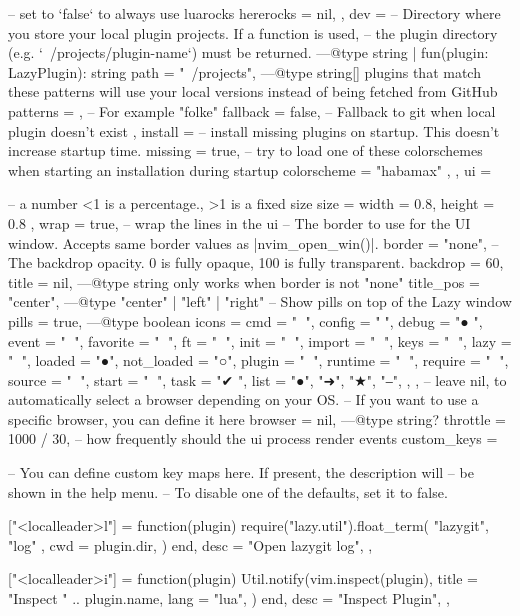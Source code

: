 \begin{listing}
{{-- set to `false` to always use luarocks
hererocks = nil,
},
dev = {
-- Directory where you store your local plugin projects. If a function is used,
-- the plugin directory (e.g. `~/projects/plugin-name`) must be returned.
---@type string | fun(plugin: LazyPlugin): string
path = "~/projects",
---@type string[] plugins that match these patterns will use your local versions instead of being fetched from GitHub
patterns = {}, -- For example {"folke"}
fallback = false, -- Fallback to git when local plugin doesn't exist
},
install = {
-- install missing plugins on startup. This doesn't increase startup time.
missing = true,
-- try to load one of these colorschemes when starting an installation during startup
colorscheme = { "habamax" },
},
ui = {
-- a number <1 is a percentage., >1 is a fixed size
size = { width = 0.8, height = 0.8 },
wrap = true, -- wrap the lines in the ui
-- The border to use for the UI window. Accepts same border values as |nvim_open_win()|.
border = "none",
-- The backdrop opacity. 0 is fully opaque, 100 is fully transparent.
backdrop = 60,
title = nil, ---@type string only works when border is not "none"
title_pos = "center", ---@type "center" | "left" | "right"
-- Show pills on top of the Lazy window
pills = true, ---@type boolean
icons = {
cmd = " ",
config = "",
debug = "● ",
event = " ",
favorite = " ",
ft = " ",
init = " ",
import = " ",
keys = " ",
lazy = "󰒲 ",
loaded = "●",
not_loaded = "○",
plugin = " ",
runtime = " ",
require = "󰢱 ",
source = " ",
start = " ",
task = "✔ ",
list = {
"●",
"➜",
"★",
"‒",
},
},
-- leave nil, to automatically select a browser depending on your OS.
-- If you want to use a specific browser, you can define it here
browser = nil, ---@type string?
throttle = 1000 / 30, -- how frequently should the ui process render events
custom_keys = {
-- You can define custom key maps here. If present, the description will
-- be shown in the help menu.
-- To disable one of the defaults, set it to false.

["<localleader>l"] = {
function(plugin)
require("lazy.util").float_term({ "lazygit", "log" }, {
cwd = plugin.dir,
})
end,
desc = "Open lazygit log",
},

["<localleader>i"] = {
function(plugin)
Util.notify(vim.inspect(plugin), {
title = "Inspect " .. plugin.name,
lang = "lua",
})
end,
desc = "Inspect Plugin",
},

}}}
\end{listing}
